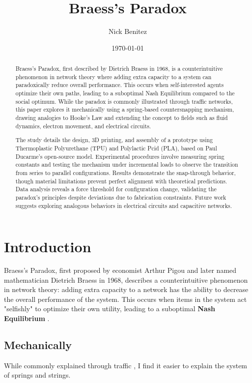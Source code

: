 \documentclass[twocolumn]{article}
\title{Braess's Paradox}
\author{Nick Benitez}
\date{\today}
\begin{document}
\begin{titlepage}
	\maketitle
	\tableofcontents
\end{titlepage}

\begin{abstract}
Braess's Paradox, first described by Dietrich Braess in 1968, is a counterintuitive phenomenon in network theory where adding extra capacity to a system can paradoxically reduce overall performance. This occurs when self-interested agents optimize their own paths, leading to a suboptimal Nash Equilibrium compared to the social optimum. While the paradox is commonly illustrated through traffic networks, this paper explores it mechanically using a spring-based countersnapping mechanism, drawing analogies to Hooke's Law and extending the concept to fields such as fluid dynamics, electron movement, and electrical circuits.

The study details the design, 3D printing, and assembly of a prototype using Thermoplastic Polyurethane (TPU) and Polylactic Pcid (PLA), based on Paul Ducarme's open-source model. Experimental procedures involve measuring spring constants and testing the mechanism under incremental loads to observe the transition from series to parallel configurations. Results demonstrate the snap-through behavior, though material limitations prevent perfect alignment with theoretical predictions. Data analysis reveals a force threshold for configuration change, validating the paradox's principles despite deviations due to fabrication constraints. Future work suggests exploring analogous behaviors in electrical circuits and capacitive networks.
\end{abstract}


\section{Introduction}
Braess's Paradox, first proposed by economist Arthur Pigou and later named mathematician Dietrich Braess in 1968, describes a counterintuitive phenomenon in network theory: adding extra capacity to a network has the ability to decrease the overall performance of the system. This occurs when items in the system act "selfishly" to optimize their own utility, leading to a suboptimal \textbf{Nash Equilibrium} \cite{braess}.

\subsection{Mechanically}
While commonly explained through traffic \cite{pas1997braess}, I find it easier to explain the system of springs and strings.
\end{document}
